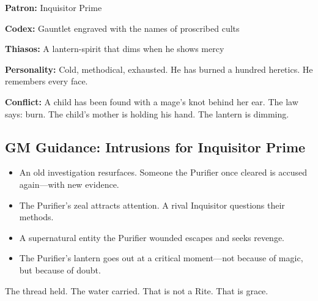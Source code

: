\textbf{Patron:} Inquisitor Prime

\textbf{Codex:} Gauntlet engraved with the names of proscribed cults

\textbf{Thiasos:} A lantern-spirit that dims when he shows mercy

\textbf{Personality:} Cold, methodical, exhausted. He has burned a hundred heretics. He remembers every face.

\textbf{Conflict:} A child has been found with a mage's knot behind her ear. The law says: burn. The child's mother is holding his hand. The lantern is dimming.

\subsection{GM Guidance: Intrusions for Inquisitor Prime}

\begin{itemize}
\item An old investigation resurfaces. Someone the Purifier once cleared is accused again—with new evidence.
\item The Purifier's zeal attracts attention. A rival Inquisitor questions their methods.
\item A supernatural entity the Purifier wounded escapes and seeks revenge.
\item The Purifier's lantern goes out at a critical moment—not because of magic, but because of doubt.
\end{itemize}

The thread held. The water carried. That is not a Rite. That is grace.
